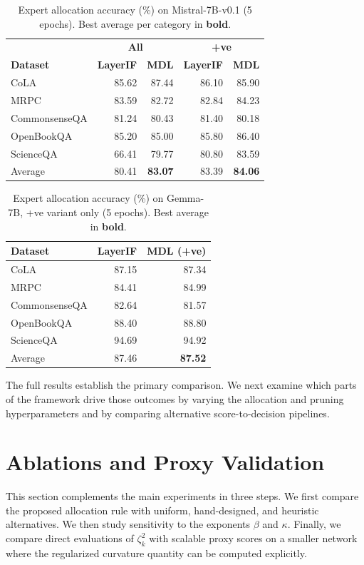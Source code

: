 \documentclass[accepted]{uai2026}%
\theoremstyle{remark}%
\begin{document}
\begin{table}[tbh]
\centering
\caption{Expert allocation accuracy (\%) on Mistral-7B-v0.1 (5 epochs).
         Best average per category in \textbf{bold}.}
\label{tab:mistral_expert_alloc}
\begin{tabular}{lrr|rr}
\toprule
& \multicolumn{2}{c|}{\textbf{All}} & \multicolumn{2}{c}{\textbf{+ve}} \\
\textbf{Dataset} & \textbf{LayerIF} & \textbf{MDL} & \textbf{LayerIF} & \textbf{MDL} \\
\midrule
CoLA        & 85.62 & 87.44 & 86.10 & 85.90 \\
MRPC        & 83.59 & 82.72 & 82.84 & 84.23 \\
CommonsenseQA & 81.24 & 80.43 & 81.40 & 80.18 \\
OpenBookQA  & 85.20 & 85.00 & 85.80 & 86.40 \\
ScienceQA   & 66.41 & 79.77 & 80.80 & 83.59 \\
\midrule
Average     & 80.41 & \textbf{83.07} & 83.39 & \textbf{84.06} \\
\bottomrule
\end{tabular}
\end{table}


\begin{table}[tbh]
\centering
\caption{Expert allocation accuracy (\%) on Gemma-7B, +ve variant only (5 epochs).
         Best average in \textbf{bold}.}
\label{tab:exp_gemma}
\begin{tabular}{lrr}
\toprule
\textbf{Dataset} & \textbf{LayerIF} & \textbf{MDL (+ve)} \\
\midrule
CoLA          & 87.15 & 87.34 \\
MRPC          & 84.41 & 84.99 \\
CommonsenseQA & 82.64 & 81.57 \\
OpenBookQA    & 88.40 & 88.80 \\
ScienceQA     & 94.69 & 94.92 \\
\midrule
Average       & 87.46 & \textbf{87.52} \\
\bottomrule
\end{tabular}
\end{table}

The full results establish the primary comparison. We next examine which parts
of the framework drive those outcomes by varying the allocation and pruning
hyperparameters and by comparing alternative score-to-decision pipelines.

\section{Ablations and Proxy Validation}
This section complements the main experiments in three steps. We first compare
the proposed allocation rule with uniform, hand-designed, and heuristic
alternatives. We then study sensitivity to the exponents $\beta$ and $\kappa$.
Finally, we compare direct evaluations of $\zeta_k^2$ with scalable proxy
scores on a smaller network where the regularized curvature quantity can be
computed explicitly.
\end{document}

